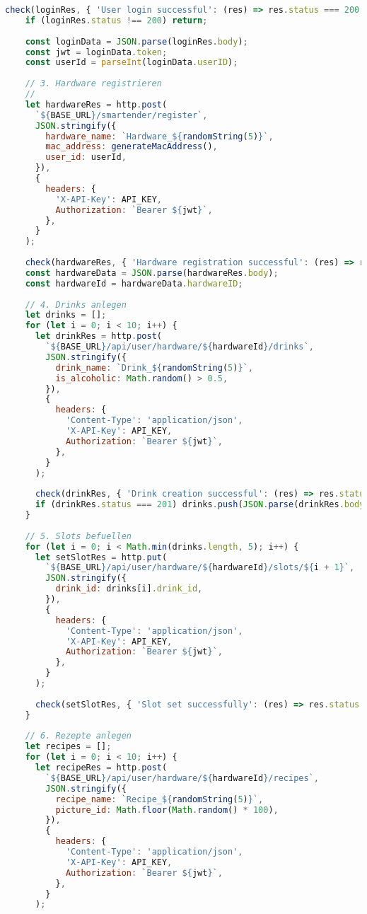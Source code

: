 \begin{lstlisting}[language=JavaScript]
    check(loginRes, { 'User login successful': (res) => res.status === 200 });
    if (loginRes.status !== 200) return;
  
    const loginData = JSON.parse(loginRes.body);
    const jwt = loginData.token;
    const userId = parseInt(loginData.userID);
  
    // 3. Hardware registrieren
    //
    let hardwareRes = http.post(
      `${BASE_URL}/smartender/register`,
      JSON.stringify({
        hardware_name: `Hardware_${randomString(5)}`,
        mac_address: generateMacAddress(),
        user_id: userId,
      }),
      {
        headers: {
          'X-API-Key': API_KEY,
          Authorization: `Bearer ${jwt}`,
        },
      }
    );
  
    check(hardwareRes, { 'Hardware registration successful': (res) => res.status === 200 });
    const hardwareData = JSON.parse(hardwareRes.body);
    const hardwareId = hardwareData.hardwareID;
  
    // 4. Drinks anlegen
    let drinks = [];
    for (let i = 0; i < 10; i++) {
      let drinkRes = http.post(
        `${BASE_URL}/api/user/hardware/${hardwareId}/drinks`,
        JSON.stringify({
          drink_name: `Drink_${randomString(5)}`,
          is_alcoholic: Math.random() > 0.5,
        }),
        {
          headers: {
            'Content-Type': 'application/json',
            'X-API-Key': API_KEY,
            Authorization: `Bearer ${jwt}`,
          },
        }
      );
  
      check(drinkRes, { 'Drink creation successful': (res) => res.status === 201 });
      if (drinkRes.status === 201) drinks.push(JSON.parse(drinkRes.body));
    }
  
    // 5. Slots befuellen
    for (let i = 0; i < Math.min(drinks.length, 5); i++) {
      let setSlotRes = http.put(
        `${BASE_URL}/api/user/hardware/${hardwareId}/slots/${i + 1}`,
        JSON.stringify({
          drink_id: drinks[i].drink_id,
        }),
        {
          headers: {
            'Content-Type': 'application/json',
            'X-API-Key': API_KEY,
            Authorization: `Bearer ${jwt}`,
          },
        }
      );
  
      check(setSlotRes, { 'Slot set successfully': (res) => res.status === 204 });
    }
  
    // 6. Rezepte anlegen
    let recipes = [];
    for (let i = 0; i < 10; i++) {
      let recipeRes = http.post(
        `${BASE_URL}/api/user/hardware/${hardwareId}/recipes`,
        JSON.stringify({
          recipe_name: `Recipe_${randomString(5)}`,
          picture_id: Math.floor(Math.random() * 100),
        }),
        {
          headers: {
            'Content-Type': 'application/json',
            'X-API-Key': API_KEY,
            Authorization: `Bearer ${jwt}`,
          },
        }
      );
  

\end{lstlisting}
